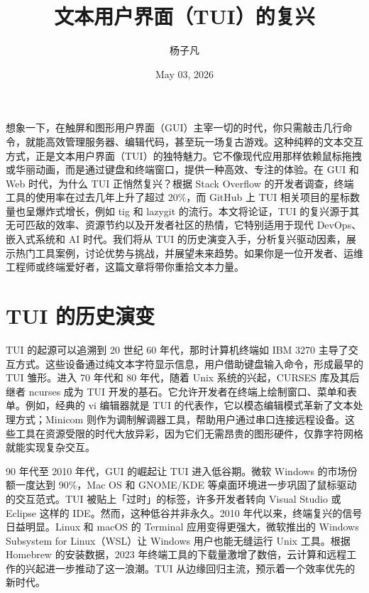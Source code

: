\title{文本用户界面（TUI）的复兴}
\author{杨子凡}
\date{May 03, 2026}
\maketitle
想象一下，在触屏和图形用户界面（GUI）主宰一切的时代，你只需敲击几行命令，就能高效管理服务器、编辑代码，甚至玩一场复古游戏。这种纯粹的文本交互方式，正是文本用户界面（TUI）的独特魅力。它不像现代应用那样依赖鼠标拖拽或华丽动画，而是通过键盘和终端窗口，提供一种高效、专注的体验。在 GUI 和 Web 时代，为什么 TUI 正悄然复兴？根据 Stack Overflow 的开发者调查，终端工具的使用率在过去几年上升了超过 20\%{}，而 GitHub 上 TUI 相关项目的星标数量也呈爆炸式增长，例如 tig 和 lazygit 的流行。本文将论证，TUI 的复兴源于其无可匹敌的效率、资源节约以及开发者社区的热情，它特别适用于现代 DevOps、嵌入式系统和 AI 时代。我们将从 TUI 的历史演变入手，分析复兴驱动因素，展示热门工具案例，讨论优势与挑战，并展望未来趋势。如果你是一位开发者、运维工程师或终端爱好者，这篇文章将带你重拾文本力量。\par
\chapter{TUI 的历史演变}
TUI 的起源可以追溯到 20 世纪 60 年代，那时计算机终端如 IBM 3270 主导了交互方式。这些设备通过纯文本字符显示信息，用户借助键盘输入命令，形成最早的 TUI 雏形。进入 70 年代和 80 年代，随着 Unix 系统的兴起，CURSES 库及其后继者 ncurses 成为 TUI 开发的基石。它允许开发者在终端上绘制窗口、菜单和表单。例如，经典的 vi 编辑器就是 TUI 的代表作，它以模态编辑模式革新了文本处理方式；Minicom 则作为调制解调器工具，帮助用户通过串口连接远程设备。这些工具在资源受限的时代大放异彩，因为它们无需昂贵的图形硬件，仅靠字符网格就能实现复杂交互。\par
90 年代至 2010 年代，GUI 的崛起让 TUI 进入低谷期。微软 Windows 的市场份额一度达到 90\%{}，Mac OS 和 GNOME/KDE 等桌面环境进一步巩固了鼠标驱动的交互范式。TUI 被贴上「过时」的标签，许多开发者转向 Visual Studio 或 Eclipse 这样的 IDE。然而，这种低谷并非永久。2010 年代以来，终端复兴的信号日益明显。Linux 和 macOS 的 Terminal 应用变得更强大，微软推出的 Windows Subsystem for Linux（WSL）让 Windows 用户也能无缝运行 Unix 工具。根据 Homebrew 的安装数据，2023 年终端工具的下载量激增了数倍，云计算和远程工作的兴起进一步推动了这一浪潮。TUI 从边缘回归主流，预示着一个效率优先的新时代。\par
